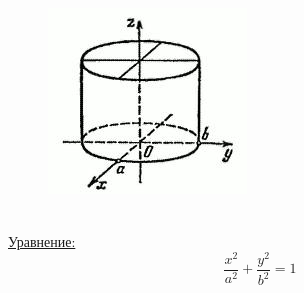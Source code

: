 \begin{figure}
    \includegraphics[width=.5\linewidth]{images/эллиптический цилиндр.jpeg}
\end{figure}

\tab\\

\underline{Уравнение:}
\[
\dfrac{x^2}{a^2} + \dfrac{y^2}{b^2} = 1
\]


